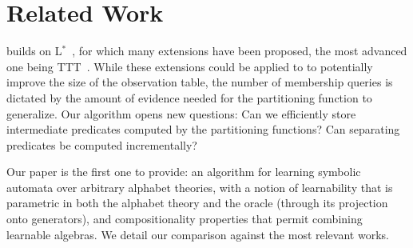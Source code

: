 \section{Related Work}



 \alg builds on L$^*$~\cite{angluin87},
for which many extensions have been proposed,
the most advanced one being TTT~\cite{Isberner2014,learnlib}.
While these extensions could be
applied to \alg  to potentially improve the
size of the observation table, the
number of membership queries is dictated by
the amount of evidence needed for the partitioning function
to generalize.
Our algorithm opens new questions:
Can we efficiently store intermediate predicates computed by the partitioning functions?
Can separating predicates be computed incrementally?

%




Our paper is the first one to provide: 
\rone an algorithm for learning symbolic automata over arbitrary alphabet theories,
with  a notion of learnability that is parametric in both the alphabet theory and the 
oracle (through its projection onto generators), and
\rtwo compositionality properties that permit combining learnable algebras.
We detail our comparison against the most relevant works.


